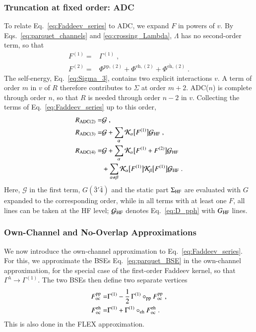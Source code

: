 \documentclass[aip,jcp,reprint,noshowkeys,superscriptaddress]{revtex4-1}
\newcommand{\cK}{\mathcal{K}}
\newcommand{\eh}{\text{eh}}
\newcommand{\teh}{\overline{\text{eh}}}
\newcommand{\pp}{\text{pp}}
\begin{document}
\subsubsection{Truncation at fixed order: ADC}
To relate Eq.~\eqref{eq:Faddeev_series} to ADC, we expand $F$ in powers
of $v$. By Eqs.~\eqref{eq:parquet_channels} and
\eqref{eq:crossing_Lambda}, $\Lambda$ has no second-order term,
so that
\begin{equation}
\label{eq:F_orders}
\begin{aligned}
F^{(1)}
= &
\Gamma^{(1)} \;,
\\
F^{(2)}
= &
\Phi^{\pp,(2)}+\Phi^{\eh,(2)}+\Phi^{\teh,(2)} \;.
\end{aligned}
\end{equation}
The self-energy, Eq.~\eqref{eq:Sigma_3}, contains two explicit
interactions $v$. A term of order $m$ in $v$ of $R$ therefore contributes to
$\Sigma$ at order $m+2$. ADC($n$) is complete through order $n$, so
that $R$ is needed through order $n-2$ in $v$. Collecting the terms of
Eq.~\eqref{eq:Faddeev_series} up to this order,
\begin{equation}
\label{eq:ADC_Faddeev}
\begin{aligned}
R_{\rm ADC(2)}
= &
\mathcal G \;,
\\
R_{\rm ADC(3)}
= &
\mathcal G+\sum_{\alpha}\cK_\alpha\big[F^{(1)}\big]\mathcal G_{\rm HF} \;,
\\
R_{\rm ADC(4)}
= &
\mathcal G+\sum_{\alpha}\cK_\alpha\big[F^{(1)}+F^{(2)}\big]\mathcal G_{\rm HF}
\\
& +\sum_{\alpha\neq\beta}
\cK_\alpha\big[F^{(1)}\big]\cK_\beta\big[F^{(1)}\big]\mathcal G_{\rm HF} \;.
\end{aligned}
\end{equation}
Here, $\mathcal G$ in the first term, $G(\bar3'\bar4)$ and the static part
$\Sigma_{\rm HF}$ are evaluated with $G$ expanded to the corresponding
order, while in all terms with at least one $F$, all lines can be taken at the HF level; $\mathcal G_{\rm HF}$ denotes Eq.~\eqref{eq:D_pph} with $G_{\rm HF}$ lines.

\subsubsection{Own-Channel and No-Overlap Approximations}

We now introduce the own-channel approximation
to Eq.~\eqref{eq:Faddeev_series}.
For this, we approximate the BSEs Eq.~\eqref{eq:parquet_BSE}
in the own-channel approximation, for the special case of 
the first-order Faddeev kernel, so that 
$\Gamma^{\lambda}\to\Gamma^{(1)}$.
The two BSEs then define two separate vertices
\begin{equation}
\begin{aligned}
F^{\pp}_{\rm oc}
= &
\Gamma^{(1)}-\frac12\,\Gamma^{(1)}\circ_{\pp}F^{\pp}_{\rm oc} \;,
\\
F^{\eh}_{\rm oc}
= &
\Gamma^{(1)}+\Gamma^{(1)}\circ_{\eh}F^{\eh}_{\rm oc} \;.
\end{aligned}
\label{eq:BSE_oc}
\end{equation}
This is also done in the FLEX approximation.\cite{Bickers1989,Bickers2004}
\end{document}
